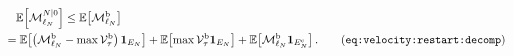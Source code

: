 \begin{align}
    &\quad
    \mathbb E\!\left[
        \mathcal M_{\ell_N}^{N|0}
    \right]
    \le
    \mathbb E\!\left[
        \mathcal M_{\ell_N}^{\mathrm b}
    \right]
    \nonumber\\&
    =
    \mathbb E\!\left[
        \left(
            \mathcal M_{\ell_N}^{\mathrm b}
            -
            \max\mathcal V^{\mathrm b}_\tau
        \right)
        \mathbf 1_{E_N}
    \right]
    +
    \mathbb E\!\left[
        \max\mathcal V^{\mathrm b}_\tau
        \mathbf 1_{E_N}
    \right]
    +
    \mathbb E\!\left[
        \mathcal M_{\ell_N}^{\mathrm b}
        \mathbf 1_{E_N^{\mathrm c}}
    \right].
    \tag{\texttt{eq:velocity:restart:decomp}}
\end{align}

